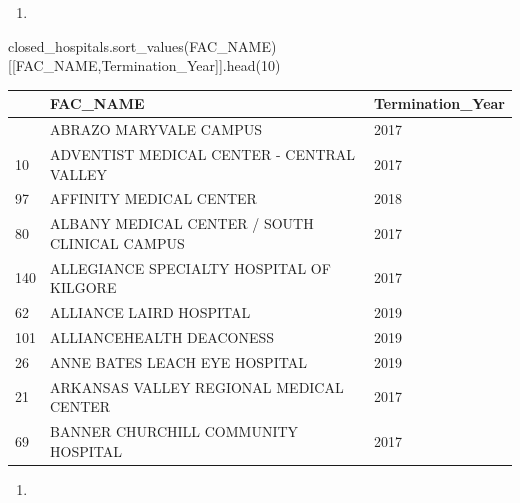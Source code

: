 \documentclass[
  letterpaper,
  DIV=11,
  numbers=noendperiod]{scrartcl}
\newenvironment{Shaded}{\begin{snugshade}}{\end{snugshade}}
\newcommand{\DecValTok}[1]{\textcolor[rgb]{0.68,0.00,0.00}{#1}}
\newcommand{\NormalTok}[1]{\textcolor[rgb]{0.00,0.23,0.31}{#1}}
\newcommand{\StringTok}[1]{\textcolor[rgb]{0.13,0.47,0.30}{#1}}
\providecommand{\tightlist}{%
  \setlength{\itemsep}{0pt}\setlength{\parskip}{0pt}}\usepackage{longtable,booktabs,array}
\begin{document}
\begin{enumerate}
\def\labelenumi{\arabic{enumi}.}
\setcounter{enumi}{1}
\tightlist
\item
\end{enumerate}

\begin{Shaded}
\begin{Highlighting}[]
\NormalTok{closed\_hospitals.sort\_values(}\StringTok{\textquotesingle{}FAC\_NAME\textquotesingle{}}\NormalTok{)[[}\StringTok{\textquotesingle{}FAC\_NAME\textquotesingle{}}\NormalTok{,}\StringTok{\textquotesingle{}Termination\_Year\textquotesingle{}}\NormalTok{]].head(}\DecValTok{10}\NormalTok{)}
\end{Highlighting}
\end{Shaded}

\begin{longtable}[]{@{}lll@{}}
\toprule\noalign{}
& FAC\_NAME & Termination\_Year \\
\midrule\noalign{}
\endhead
\bottomrule\noalign{}
\endlastfoot
4 & ABRAZO MARYVALE CAMPUS & 2017 \\
10 & ADVENTIST MEDICAL CENTER - CENTRAL VALLEY & 2017 \\
97 & AFFINITY MEDICAL CENTER & 2018 \\
80 & ALBANY MEDICAL CENTER / SOUTH CLINICAL CAMPUS & 2017 \\
140 & ALLEGIANCE SPECIALTY HOSPITAL OF KILGORE & 2017 \\
62 & ALLIANCE LAIRD HOSPITAL & 2019 \\
101 & ALLIANCEHEALTH DEACONESS & 2019 \\
26 & ANNE BATES LEACH EYE HOSPITAL & 2019 \\
21 & ARKANSAS VALLEY REGIONAL MEDICAL CENTER & 2017 \\
69 & BANNER CHURCHILL COMMUNITY HOSPITAL & 2017 \\
\end{longtable}

\begin{enumerate}
\def\labelenumi{\arabic{enumi}.}
\setcounter{enumi}{2}
\tightlist
\item
\end{enumerate}
\end{document}
